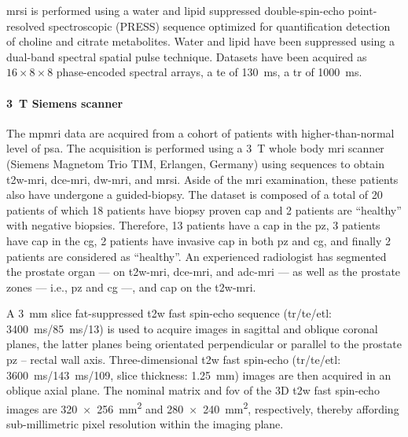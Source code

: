 \ac{mrsi} is performed using a water and lipid suppressed double-spin-echo point-resolved spectroscopic (PRESS) sequence optimized for quantification detection of choline and citrate metabolites.
Water and lipid have been suppressed using a dual-band spectral spatial pulse technique.
Datasets have been acquired as $16 \times 8 \times 8$ phase-encoded spectral arrays, a \ac{te} of \SI{130}{\ms}, a \ac{tr} of \SI{1000}{\ms}.%

\paragraph{\SI{3}{\tesla} Siemens scanner}

The \ac{mpmri} data are acquired from a cohort of patients with higher-than-normal level of \ac{psa}.
The acquisition is performed using a \SI{3}{\tesla} whole body \ac{mri} scanner (Siemens Magnetom Trio TIM, Erlangen, Germany) using sequences to obtain \ac{t2w}-\ac{mri}, \ac{dce}-\ac{mri}, \ac{dw}-\ac{mri}, and \ac{mrsi}.
Aside of the \ac{mri} examination, these patients also have undergone a guided-biopsy.
The dataset is composed of a total of 20 patients of which 18 patients have biopsy proven \ac{cap} and 2 patients are ``healthy'' with negative biopsies.
Therefore, 13 patients have a \ac{cap} in the \ac{pz}, 3 patients have \ac{cap} in the \ac{cg}, 2 patients have invasive \ac{cap} in both \ac{pz} and \ac{cg}, and finally 2 patients are considered as ``healthy''.
An experienced radiologist has segmented the prostate organ --- on \ac{t2w}-\ac{mri}, \ac{dce}-\ac{mri}, and \ac{adc}-\ac{mri} --- as well as the prostate zones --- i.e., \ac{pz} and \ac{cg} ---, and \ac{cap} on the \ac{t2w}-\ac{mri}.

A \SI{3}{\mm} slice fat-suppressed \ac{t2w} fast spin-echo sequence (\ac{tr}/\ac{te}/\ac{etl}: \SI{3400}{\ms}/\SI{85}{\ms}/13) is used to acquire images in sagittal and oblique coronal planes, the latter planes being orientated perpendicular or parallel to the prostate \ac{pz} – rectal wall axis.
Three-dimensional \ac{t2w} fast spin-echo (\ac{tr}/\ac{te}/\ac{etl}: \SI{3600}{\ms}/\SI{143}{\ms}/109, slice thickness: \SI{1.25}{\mm}) images are then acquired in an oblique axial plane.
The nominal matrix and \ac{fov} of the 3D \ac{t2w} fast spin-echo images are \SI[product-units=repeat]{320x256}{\milli\metre\squared} and \SI[product-units=repeat]{280x240}{\milli\metre\squared}, respectively, thereby affording sub-millimetric pixel resolution within the imaging plane.

